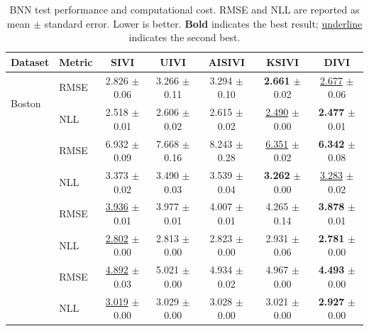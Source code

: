 \begin{table}[t]
\centering
\caption{BNN test performance and computational cost. RMSE and NLL are reported as mean $\pm$ standard error. Lower is better. \textbf{Bold} indicates the best result; \underline{underline} indicates the second best.}
\label{tab:bnn-rmse-nll}
\small
\setlength{\tabcolsep}{4.5pt}
\renewcommand{\arraystretch}{1.08}
\begin{tabular}{llccccc}
\toprule
Dataset & Metric & SIVI & UIVI & AISIVI & KSIVI & DIVI \\
\midrule
\multirow{2}{*}{Boston} & RMSE & 2.826 $\pm$ {\footnotesize 0.06} & 3.266 $\pm$ {\footnotesize 0.11} & 3.294 $\pm$ {\footnotesize 0.10} & \textbf{2.661} $\pm$ {\footnotesize 0.02} & \underline{2.677} $\pm$ {\footnotesize 0.06} \\
 & NLL & 2.518 $\pm$ {\footnotesize 0.01} & 2.606 $\pm$ {\footnotesize 0.02} & 2.615 $\pm$ {\footnotesize 0.02} & \underline{2.490} $\pm$ {\footnotesize 0.00} & \textbf{2.477} $\pm$ {\footnotesize 0.01} \\
\addlinespace[2pt]
\multirow{2}{*}{Concrete} & RMSE & 6.932 $\pm$ {\footnotesize 0.09} & 7.668 $\pm$ {\footnotesize 0.16} & 8.243 $\pm$ {\footnotesize 0.28} & \underline{6.351} $\pm$ {\footnotesize 0.02} & \textbf{6.342} $\pm$ {\footnotesize 0.08} \\
 & NLL & 3.373 $\pm$ {\footnotesize 0.02} & 3.490 $\pm$ {\footnotesize 0.03} & 3.539 $\pm$ {\footnotesize 0.04} & \textbf{3.262} $\pm$ {\footnotesize 0.00} & \underline{3.283} $\pm$ {\footnotesize 0.02} \\
\addlinespace[2pt]
\multirow{2}{*}{Power} & RMSE & \underline{3.936} $\pm$ {\footnotesize 0.01} & 3.977 $\pm$ {\footnotesize 0.01} & 4.007 $\pm$ {\footnotesize 0.01} & 4.265 $\pm$ {\footnotesize 0.14} & \textbf{3.878} $\pm$ {\footnotesize 0.01} \\
 & NLL & \underline{2.802} $\pm$ {\footnotesize 0.00} & 2.813 $\pm$ {\footnotesize 0.00} & 2.823 $\pm$ {\footnotesize 0.00} & 2.931 $\pm$ {\footnotesize 0.06} & \textbf{2.781} $\pm$ {\footnotesize 0.00} \\
\addlinespace[2pt]
\multirow{2}{*}{Protein} & RMSE & \underline{4.892} $\pm$ {\footnotesize 0.03} & 5.021 $\pm$ {\footnotesize 0.00} & 4.934 $\pm$ {\footnotesize 0.02} & 4.967 $\pm$ {\footnotesize 0.00} & \textbf{4.493} $\pm$ {\footnotesize 0.00} \\
 & NLL & \underline{3.019} $\pm$ {\footnotesize 0.00} & 3.029 $\pm$ {\footnotesize 0.00} & 3.028 $\pm$ {\footnotesize 0.00} & 3.021 $\pm$ {\footnotesize 0.00} & \textbf{2.927} $\pm$ {\footnotesize 0.00} \\

\end{tabular}
\end{table}
